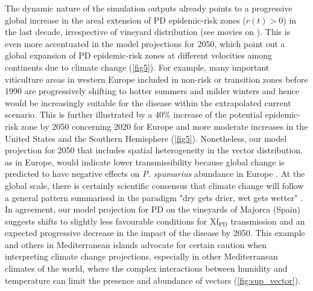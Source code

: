     The dynamic nature of the simulation outputs already points to a
    progressive
    global increase in the areal extension of PD epidemic-risk zones ($r(t)>0$)
    in
    the last decade, irrespective of vineyard distribution (see movies on
    \cite{Webpage}). This is even more accentuated in the model projections for
    2050, which point out a global expansion of PD epidemic-risk zones at
    different
    velocities among continents due to climate change (\cref{fig5}). For
    example,
    many important viticulture areas in western Europe included in non-risk or
    transition zones before 1990 are progressively shifting to hotter summers
    and
    milder winters and hence would be increasingly suitable for the disease
    within
    the extrapolated current scenario. This is further illustrated by a $40\%$
    increase of the potential epidemic-risk zone by 2050 concerning 2020 for
    Europe
    and more moderate increases in the United States and the Southern
    Hemisphere
    (\cref{fig5}). Nonetheless, our model projection for 2050 that includes
    spatial
    heterogeneity in the vector distribution, as in Europe, would indicate
    lower
    transmissibility because global change is predicted to have negative
    effects on
    \textit{P. spumarius} abundance in Europe \cite{Godefroid2021,Karban2018}.
    At
    the global scale, there is certainly scientific consensus that climate
    change
    will follow a general pattern summarised in the paradigm "dry gets drier,
    wet
    gets wetter" \cite{Feng2015}. In agreement, our model projection for PD on
    the
    vineyards of Majorca (Spain) suggests shifts to slightly less favourable
    conditions for Xf$_{\textrm{PD}}$ transmission and an expected progressive
    decrease in the impact of the disease by 2050. This example and others in
    Mediterranean islands advocate for certain
    caution
    when interpreting climate change projections, especially in other
    Mediterranean
    climates of the world, where the complex interactions between humidity and
    temperature can limit the presence and abundance of vectors
    (\cref{fig:sup_vector}).


